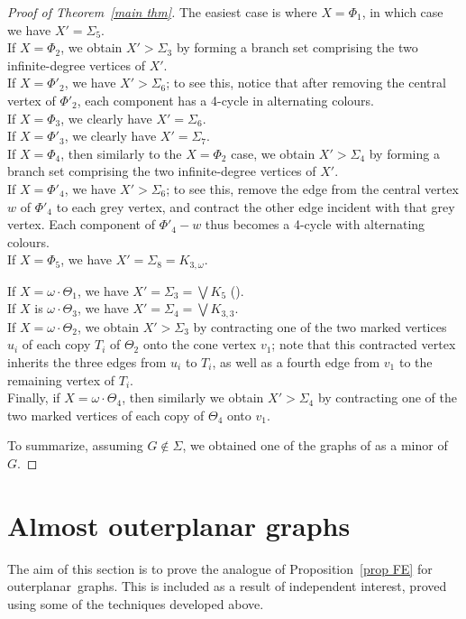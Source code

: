 \documentclass{article}
\newcommand{\Sig}{\ensuremath{\Sigma}}
\newcommand{\omdot}{\omega \cdot}
\newcommand{\G}{\ensuremath{G}}
\newcommand{\OP}{outerplanar}
\newcommand{\Ktt}{\ensuremath{K_{3,3}}}
\newcommand{\Tr}[1]{Theorem~\ref{#1}}
\newcommand{\Prr}[1]{Pro\-position~\ref{#1}}
\begin{document}
\begin{proof}[Proof of \Tr{main thm}]
\medskip
The easiest case is where $X = \Phi_1$, in which case we have $X' = \Sig_5$.  \\
If $X = \Phi_2$, we obtain $X' > \Sig_3$ by forming a branch set comprising the two infinite-degree vertices of $X'$. \\
If $X = \Phi'_2$, we have $X' > \Sig_6$; to see this, notice that after removing the central vertex of $\Phi'_2$, each component has a 4-cycle in alternating colours. \\ 
If $X = \Phi_3$, we clearly have $X' = \Sig_6$. \\
If $X = \Phi'_3$, we clearly have $X' = \Sig_7$. \\
If $X = \Phi_4$, then similarly to the  $X = \Phi_2$ case, we obtain $X' > \Sig_4$ by forming a branch set comprising the two  infinite-degree vertices of $X'$. \\
If $X = \Phi'_4$, we have $X' > \Sig_6$; to see this, remove the edge from the central vertex $w$ of $\Phi'_4$ to each grey vertex, and contract the other edge incident with that grey vertex. Each component of $\Phi'_4-w$ thus becomes a 4-cycle with alternating colours. \\
If  $X = \Phi_5$,  we have $X' = \Sig_8 = K_{3,\omega}$. 

\medskip
If $X = \omdot \Theta_1$, we have $X' = \Sig_3 = \bigvee K_5$ (). \\
If $X$ is $\omdot \Theta_3$,  we have $X' = \Sig_4= \bigvee \Ktt$. \\
If $X =\omdot \Theta_2$, we obtain  $X' > \Sig_3$ by contracting one of the two marked vertices $u_i$ of each copy $T_i$ of $\Theta_2$ onto the cone vertex $v_1$; note that this contracted vertex inherits the three edges from $u_i$ to  $T_i$, as well as a fourth edge from $v_1$ to the remaining vertex of $T_i$. \\
Finally, if $X = \omdot \Theta_4$, then similarly we obtain  $X' > \Sig_4$ by contracting one of the two marked vertices of each copy of $\Theta_4$ onto $v_1$.

To summarize, assuming $G \not\in \Sig$, we obtained one of the graphs of  as a minor of \G.
\end{proof}



\section{Almost outerplanar graphs} \label{sec OPE}

The aim of this section is to prove the analogue of \Prr{prop FE} for \OP\ graphs. This is included as a result of independent interest, proved using some of the techniques developed above. 
\end{document}
